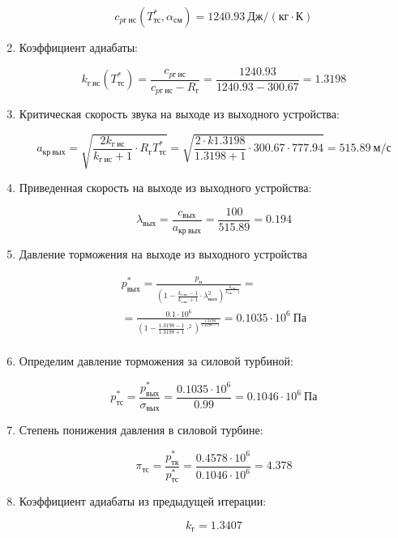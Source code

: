 \documentclass[a4paper,12pt]{article}
\begin{document}
\begin{enumerate}
	\[ c_{pг\ ис} (T_{тс}^*, \alpha_{см}) = 1240.93\ Дж/ (кг \cdot К) \]
	
	\item Коэффициент адиабаты:
	
	\[
	k_{г\ ис} (T_{тс}^*)  = \frac{ c_{pг\ ис} }{ c_{pг\ ис} - R_г } = 
			\frac{ 1240.93 }{ 1240.93 - 300.67 } = 
			1.3198
	\]

	\item Критическая скорость звука на выходе из выходного устройства:

	\[
		a_{кр\ вых} = \sqrt{\frac{2 k_{г\ ис}}{k_{г\ ис} + 1} \cdot R_г T_{тс}^* } =
		\sqrt{
			\frac{2 \cdot k1.3198
			}{
			1.3198 + 1} \cdot
			300.67 \cdot 777.94
		} =
		515.89\ м/с
	\]

	\item Приведенная скорость на выходе из выходного устройства:

	\[
		\lambda_{вых} = \frac{c_{вых}}{a_{кр\ вых}} =
			\frac{100}{515.89} =
		0.194
	\]

	\item Давление торможения на выходе из выходного устройства
	
	\begin{gather*}
	    p_{вых}^* = \frac{ p_н
				}{
					\left(
						1 - \frac{ k_{г\ ис} - 1 }{ k_{г\ ис} + 1 } \cdot \lambda_{вых} ^ 2
					\right)
						^ {
							\frac{ k_{г\ ис} }{ k_{г\ ис} - 1 }
						}
				} =\\
	    = \frac{ 0.1 \cdot 10^6
		}{
			\left(
				1 - \frac{ 1.3198 - 1 }{ 1.3198 + 1 } \cdot  ^ 2
			\right)
				^ {
					\frac{ 1.3198 }{ 1.3198 - 1 }
				}
				} =
		0.1035 \cdot 10^6\ Па\\
	\end{gather*}
	
	\item Определим давление торможения за силовой турбиной:
	
	\[
	p_{тс}^* = \frac{ p_{вых}^* }{ \sigma_{вых} } = \frac{ 0.1035 \cdot 10^6 }{ 0.99 } =
			0.1046 \cdot 10^6\ Па
	\]

	\item Степень понижения давления в силовой турбине:
	
	\[ \pi_{тс} = \frac{ p_{тк}^* }{ p_{тс}^* } =
			\frac{ 
				0.4578 \cdot 10^6 
			}{ 
				0.1046 \cdot 10^6 
			} = 
			4.378
	\]
	
	\item Коэффициент адиабаты из предыдущей итерации:
	
	\[ k_г = 1.3407 \]
	

\end{enumerate}
\end{document}
